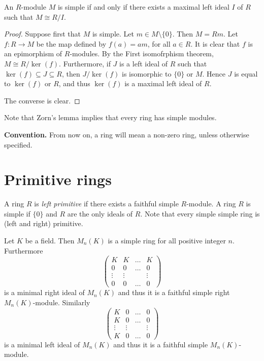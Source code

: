 \begin{lemma}\label{Lema 1.1.2}
An $R$-module $M$ is simple if and only if there exists a maximal left ideal $I$ of $R$ such that
$M\cong R/I$.
\end{lemma}

\begin{proof}
Suppose first that $M$ is simple. Let  $m\in M\setminus\{ 0\}$. Then $M=Rm$.
Let $f\colon R\rightarrow M$ be the map defined by $f(a)=am$, for all $a\in
R$. It is clear that $f$ is an epimorphism of $R$-modules. By the First isomofrphism theorem, $M\cong R/\ker(f)$. 
Furthermore, if $J$ is a left ideal of
$R$ such that $\ker(f)\subseteq J\subseteq R$, then
$J/\ker(f)$ is isomorphic to $\{0\}$ or $M$. Hence $J$ is equal to
$\ker(f)$ or $R$, and thus $\ker(f)$ is a maximal left ideal of $R$.

The converse is clear. 
\end{proof}

Note that Zorn's lemma implies that every ring has simple modules.

\bigskip

{\bf Convention.} From now on, a ring will mean a non-zero ring, unless otherwise specified. 
\bigskip

\section*{Primitive rings}

A ring $R$ is {\em left primitive} if there exists a faithful simple $R$-module. A ring $R$ is simple if $\{0\}$ and $R$ are the only ideals of $R$.
Note that every simple simple ring is (left and right) primitive.

\begin{example}
Let $K$ be a field. Then $M_n(K)$ is a simple ring for all positive integer $n$. Furthermore
$$\left(\begin{array}{cccc} K&K&\ldots&K\\
0&0&\ldots&0\\
\vdots &\vdots &&\vdots\\
0&0&\ldots&0\end{array}\right)$$
is a minimal right ideal of $M_n(K)$ and thus it is a faithful simple
right $M_n(K)$-module. Similarly
$$\left(\begin{array}{cccc} K&0&\ldots&0\\
	K&0&\ldots&0\\
	\vdots &\vdots &&\vdots\\
	K&0&\ldots&0\end{array}\right)$$
is a minimal left ideal of $M_n(K)$ and thus it is a faithful simple
$M_n(K)$-module. 
\end{example}

